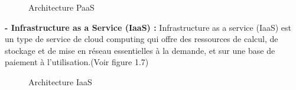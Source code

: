 \begin{figure}[H]
    \begin{center}

    \end{center}

    \caption{ Architecture PaaS}
\end{figure}
\noindent \textbf{\LARGE - Infrastructure as a Service (IaaS) : }\textsf{\selectfont{} Infrastructure as a service (IaaS) est un type de service de cloud computing qui offre des ressources de calcul, de stockage et de mise en réseau essentielles à la demande, et sur une base de paiement à l’utilisation.(Voir figure 1.7)\cite{5}}\\[0.1cm]
\begin{figure}[H]
    \begin{center}

    \end{center}

    \caption{ Architecture IaaS}
\end{figure}
